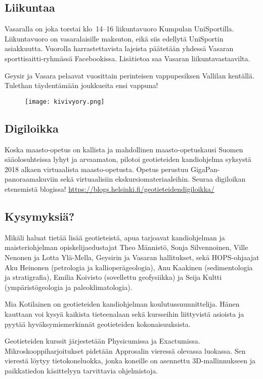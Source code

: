 \documentclass[../ala_hataile.tex]{subfiles}
\begin{document}
\subsection*{Liikuntaa}
Vasaralla on joka torstai klo~14--16 liikuntavuoro Kumpulan UniSportilla. Liikunta\-vuoro on vasaralaisille maksuton, eikä siis edellytä UniSportin asiakkuutta. Vuorolla harrastettavista lajeista päätetään yhdessä Vasaran sportti\-saitti-ryhmässä Facebookissa. Lisätietoa saa Vasaran liikunta\-vastaavilta.

Geysir ja Vasara pelaavat vuosittain perinteisen vappu\-pesiksen Vallilan kentällä. Tulethan täydentämään joukkueita ensi vappuna!
\begin{figure}[b!]
	\texttt{[image: kivivyory.png]}
\end{figure}

\subsection*{Digiloikka}
Koska maasto-opetus on kallista ja mahdollinen maasto-opetus\-kausi Suomen sää\-olo\-suhteissa lyhyt ja arvaamaton, pilotoi geotieteiden kandi\-ohjelma syksystä 2018 alkaen virtuaalista maasto-opetusta. Opetus perustuu GigaPan-panoraama\-kuviin sekä virtuaalisiin ekskursio\-materiaaleihin. Seuraa digi\-loikan etenemistä blogissa! \url{https://blogs.helsinki.fi/geotieteidendigiloikka/}
\subsection*{Kysymyksiä?}
Mikäli haluat tietää lisää geotieteistä, apua tarjoavat kandiohjelman ja maisteriohjelman opiskelija\-edustajat Theo Männistö, Sonja Silvennoinen, Ville Nenonen ja Lotta Ylä-Mella, Geysirin ja Vasaran hallitukset, sekä HOPS-ohjaajat Aku Heinonen (petrologia ja kallioperägeologia), Anu Kaakinen (sedimentologia ja stratigrafia), Emilia Koivisto (sovellettu geo\-fysiikka) ja Seija Kultti (ympäristö\-geologia ja paleo\-klimatologia).

Mia Kotilainen on geotieteiden kandiohjelman koulutussuunnittelija. Hänen kauttaan voi kysyä kaikista tieteenalaan sekä kursseihin liittyvistä asioista ja pyytää hyväksymismerkinnät geotieteiden kokonaisuuksista.

Geotieteiden kurssit järjestetään Physicumissa ja Exactumissa. Mikro\-skooppi\-harjoitukset pidetään Approsalin vieressä olevassa luokassa. Sen vierestä löytyy tietokoneluokka, jonka koneille on asennettu 3D-mallinnukseen ja paikkatiedon käsittelyyn tarvittavia ohjelmistoja.
\end{document}
